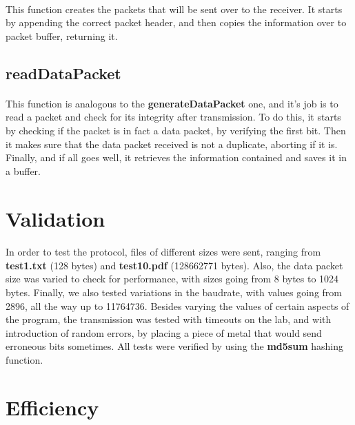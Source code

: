 \documentclass[11pt]{article}
\begin{document}
\paragraph{}This function creates the packets that will be sent over to the receiver. It starts by appending
the correct packet header, and then copies the information over to packet buffer, returning it.

\subsection*{readDataPacket}

\paragraph{}This function is analogous to the \textbf{generateDataPacket} one, and it's job is to read a
packet and check for its integrity after transmission. To do this, it starts by checking if the packet is in
fact a data packet, by verifying the first bit. Then it makes sure that the data packet received is not a
duplicate, aborting if it is. Finally, and if all goes well, it retrieves the information contained and saves
it in a buffer.

\section{Validation}

\paragraph{}In order to test the protocol, files of different sizes were sent, ranging from
\textbf{test1.txt} (128 bytes) and \textbf{test10.pdf} (128662771 bytes). Also, the data packet size was
varied to check for performance, with sizes going from 8 bytes to 1024 bytes. Finally, we also tested
variations in the baudrate, with values going from 2896, all the way up to 11764736. Besides varying the
values of certain aspects of the program, the transmission was tested with timeouts on the lab, and with
introduction of random errors, by placing a piece of metal that would send erroneous bits sometimes. All
tests were verified by using the \textbf{md5sum} hashing function.

\section{Efficiency}
\end{document}
